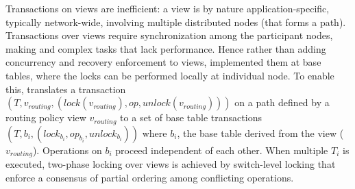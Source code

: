  Transactions on
views are inefficient: a view is by nature application-specific,
typically network-wide, involving multiple distributed nodes (\eg that
forms a path).  Transactions over views require synchronization among
the participant nodes, making  and  complex
tasks that lack performance.  Hence rather than adding concurrency and
recovery enforcement to views, \Sys implemented them at base tables,
where the locks can be performed locally at individual node.  To
enable this, \Sys translates a transaction $(T,v_{routing},
(lock(v_{routing}),op,unlock(v_{routing})))$ on a path defined by a
routing policy view $v_{routing}$ to a set of base table transactions
$(T,b_i, (lock_{b_i}, op_{b_i}, unlock_{b_i})) $ where $b_i$, the base
table derived from the view
($v_{routing}$). 
Operations on $b_i$ proceed independent of each other. When multiple
$T_i$ is executed, two-phase locking over views is achieved by
switch-level locking that enforce a consensus of partial ordering
among conflicting operations.



